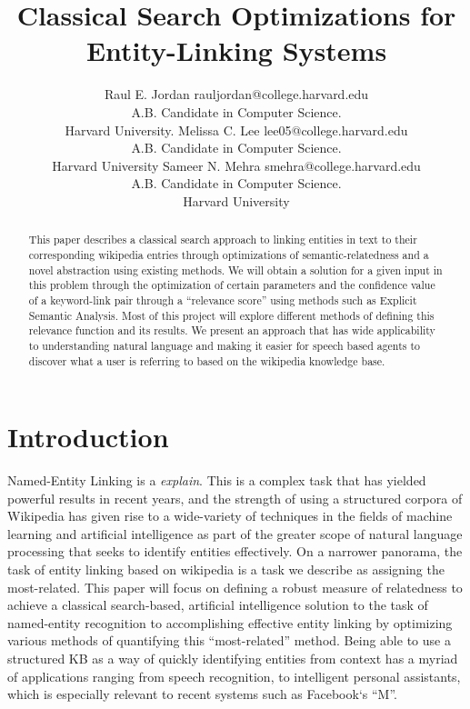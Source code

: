 \documentclass[twoside,11pt]{article}
\begin{document}
\title{Classical Search Optimizations for Entity-Linking Systems}

\author{\name Raul E. Jordan \email rauljordan@college.harvard.edu \\
       \addr A.B. Candidate in Computer Science. \\ Harvard University.
       \AND
       \name Melissa C. Lee \email lee05@college.harvard.edu \\
       \addr A.B. Candidate in Computer Science. \\
       Harvard University
       \AND
       \name Sameer N. Mehra \email smehra@college.harvard.edu \\
       \addr A.B. Candidate in Computer Science. \\
       Harvard University}



\maketitle


\begin{abstract}
This paper describes a classical search approach to linking entities in text to their corresponding wikipedia entries through optimizations of semantic-relatedness and a novel abstraction using existing methods. We will obtain a solution for a given input in this problem through the optimization of certain parameters and the confidence value of a keyword-link pair through a ``relevance score'' using methods such as Explicit Semantic Analysis. Most of this project will explore different methods of defining this relevance function and its results. We present an approach that has wide applicability to understanding natural language and making it easier for speech based agents to discover what a user is referring to based on the wikipedia knowledge base.
\end{abstract}


\section{Introduction}

Named-Entity Linking is a \textit{explain}. This is a complex task that has yielded powerful results in recent years, and the strength of using a structured corpora of Wikipedia has given rise to a wide-variety of techniques in the fields of machine learning and artificial intelligence as part of the greater scope of natural language processing that seeks to identify entities effectively. On a narrower panorama, the task of entity linking based on wikipedia is a task we describe as assigning the most-related. This paper will focus on defining a robust measure of relatedness to achieve a classical search-based, artificial intelligence solution to the task of named-entity recognition  to accomplishing effective entity linking by optimizing various methods of quantifying this “most-related” method. Being able to use a structured KB as a way of quickly identifying entities from context has a myriad of applications ranging from speech recognition, to intelligent personal assistants, which is especially relevant to recent systems such as Facebook`s ``M''.
\end{document}
